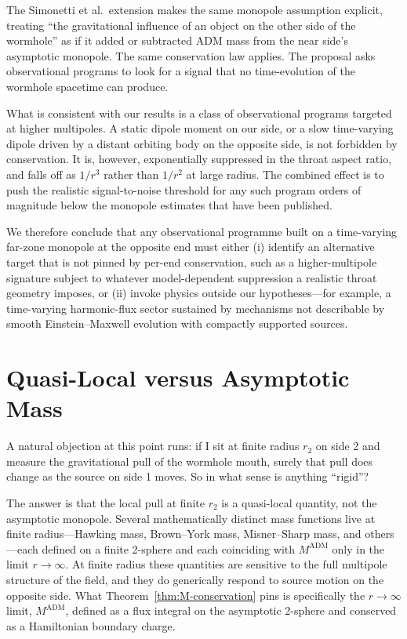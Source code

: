 \documentclass[aps,prd,onecolumn,nofootinbib,superscriptaddress]{revtex4-2}
\begin{document}
The Simonetti et al.\ extension\cite{SimonettiEtAl2021SensitiveSearches} makes the same monopole assumption explicit, treating ``the gravitational influence of an object on the other side of the wormhole'' as if it added or subtracted ADM mass from the near side's asymptotic monopole. The same conservation law applies. The proposal asks observational programs to look for a signal that no time-evolution of the wormhole spacetime can produce.

What is consistent with our results is a class of observational programs targeted at higher multipoles. A static dipole moment on our side, or a slow time-varying dipole driven by a distant orbiting body on the opposite side, is not forbidden by conservation. It is, however, exponentially suppressed in the throat aspect ratio, and falls off as $1/r^3$ rather than $1/r^2$ at large radius. The combined effect is to push the realistic signal-to-noise threshold for any such program orders of magnitude below the monopole estimates that have been published.

We therefore conclude that any observational programme built on a time-varying far-zone monopole at the opposite end must either (i) identify an alternative target that is not pinned by per-end conservation, such as a higher-multipole signature subject to whatever model-dependent suppression a realistic throat geometry imposes, or (ii) invoke physics outside our hypotheses---for example, a time-varying harmonic-flux sector sustained by mechanisms not describable by smooth Einstein--Maxwell evolution with compactly supported sources.

\section{Quasi-Local versus Asymptotic Mass}
\label{sec:quasilocal}

A natural objection at this point runs: if I sit at finite radius $r_2$ on side 2 and measure the gravitational pull of the wormhole mouth, surely that pull does change as the source on side 1 moves. So in what sense is anything ``rigid''?

The answer is that the local pull at finite $r_2$ is a quasi-local quantity, not the asymptotic monopole. Several mathematically distinct mass functions live at finite radius---Hawking mass, Brown--York mass, Misner--Sharp mass, and others---each defined on a finite 2-sphere and each coinciding with $M^{\mathrm{ADM}}$ only in the limit $r\to\infty$.\cite{Szabados2009Quasilocal} At finite radius these quantities are sensitive to the full multipole structure of the field, and they do generically respond to source motion on the opposite side. What Theorem~\ref{thm:M-conservation} pins is specifically the $r\to\infty$ limit, $M^{\mathrm{ADM}}$, defined as a flux integral on the asymptotic 2-sphere and conserved as a Hamiltonian boundary charge.
\end{document}
